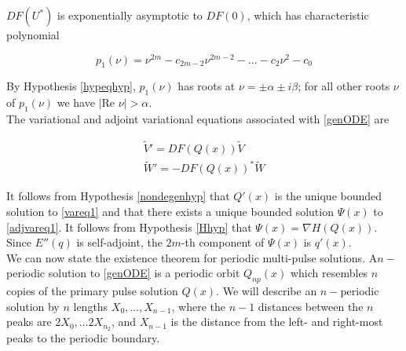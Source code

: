 \documentclass[12pt]{article}
\def\R{{\mathbb R}}
\begin{document}
$DF(U^*)$ is exponentially asymptotic to $DF(0)$, which has characteristic polynomial

\begin{equation}\label{charpolyDF0}
p_1(\nu) = \nu^{2m} - c_{2m-2} \nu^{2m-2} - \dots - c_2 \nu^2 - c_0
\end{equation}

By Hypothesis \ref{hypeqhyp}, $p_1(\nu)$ has roots at $\nu = \pm \alpha \pm i \beta$; for all other roots $\nu$ of $p_1(\nu)$ we have $|\text{Re }\nu| > \alpha$.\\

The variational and adjoint variational equations associated with \eqref{genODE} are

\begin{align}
\tilde{V}' = DF(Q(x))\tilde{V} \label{vareq1} \\
\tilde{W}' = -DF(Q(x))^* \tilde{W} \label{adjvareq1}
\end{align}

It follows from Hypothesis \ref{nondegenhyp} that $Q'(x)$ is the unique bounded solution to \eqref{vareq1} and that there exists a unique bounded solution $\Psi(x)$ to \eqref{adjvareq1}. It follows from Hypothesis \ref{Hhyp} that $\Psi(x) = \nabla H(Q(x))$. Since $E''(q)$ is self-adjoint, the $2m$-th component of $\Psi(x)$ is $q'(x)$.\\






We can now state the existence theorem for periodic multi-pulse solutions. A$n-$periodic solution to \eqref{genODE} is a periodic orbit $Q_{np}(x)$ which resembles $n$ copies of the primary pulse solution $Q(x)$. We will describe an $n-$periodic solution by $n$ lengths $X_0, \dots, X_{n-1}$, where the $n-1$ distances between the $n$ peaks are $2X_0, \dots 2X_{n_2}$, and $X_{n-1}$ is the distance from the left- and right-most peaks to the periodic boundary.
\end{document}
